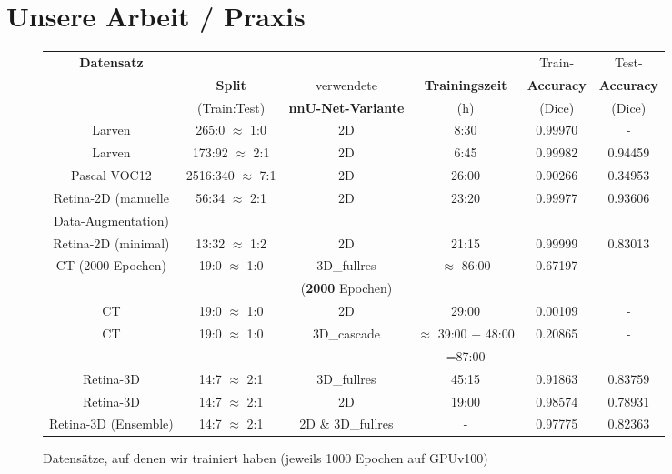 \section{Unsere Arbeit / Praxis}
\begin{figure}[H]
\begin{tabular}{|c|c|c|c|c|c|}
\hline 
\multirow{3}{*}{\textbf{Datensatz}} &  &  & & Train-& Test- \\ 
 & \textbf{Split} & verwendete & \textbf{Trainingszeit} & \textbf{Accuracy}& \textbf{Accuracy} \\ 
 & (Train:Test) & \textbf{nnU-Net-Variante} & (h) & (Dice)& (Dice)  \\ 
\hline 
\hline
Larven \cite{larven} & 265:0 $\approx$ 1:0 & 2D & 8:30 & 0.99970 & - \\ 
\hline 
Larven \cite{larven}& 173:92 $\approx$ 2:1 & 2D & 6:45 & 0.99982 & 0.94459 \\ 
\hline 
Pascal VOC12 \cite{PascalVOCDatensatz}& 2516:340 $\approx$ 7:1 & 2D & 26:00 & 0.90266 & 0.34953 \\ 
\hline 
Retina-2D \cite{retina2d} (manuelle & \multirow{2}{*}{56:34 $\approx$ 2:1} & \multirow{2}{*}{2D} & \multirow{2}{*}{23:20} & \multirow{2}{*}{0.99977} &\multirow{2}{*}{0.93606}  \\ 
Data-Augmentation)&  & & & &  \\ 
\hline 
Retina-2D \cite{retina2d} (minimal) & 13:32 $\approx$ 1:2 & 2D & 21:15 & 0.99999 &  0.83013 \\ 
\hline 
\multirow{2}{*}{CT \cite{ctDatensatz} (2000 Epochen)} & \multirow{2}{*}{19:0 $\approx$ 1:0} & 3D\_fullres & \multirow{2}{*}{$\approx$ 86:00}  & \multirow{2}{*}{0.67197} & \multirow{2}{*}{-} \\ 
 &  & (\textbf{2000} Epochen) & &  &  \\ 
\hline 
CT \cite{ctDatensatz} & 19:0 $\approx$ 1:0 & 2D & 29:00 & 0.00109 & - \\ 
\hline 
\multirow{2}{*}{CT \cite{ctDatensatz}} & \multirow{2}{*}{19:0 $\approx$ 1:0} & \multirow{2}{*}{3D\_cascade} & $\approx$ 39:00 + 48:00 & \multirow{2}{*}{0.20865} & \multirow{2}{*}{-} \\ 
 &  &  & =87:00 &  & \\ 
\hline 
Retina-3D \cite{retina3dDatensatz} & 14:7 $\approx$ 2:1 & 3D\_fullres & 45:15 & 0.91863 & 0.83759 \\ 
\hline 
Retina-3D \cite{retina3dDatensatz} & 14:7 $\approx$ 2:1  & 2D & 19:00 & 0.98574 & 0.78931 \\ 
\hline 
Retina-3D \cite{retina3dDatensatz} (Ensemble) & 14:7 $\approx$ 2:1 & 2D \& 3D\_fullres & - & 0.97775 & 0.82363 \\ 
\hline
\end{tabular} 
\caption{Datensätze, auf denen wir trainiert haben (jeweils 1000 Epochen auf GPUv100)\\[1.7cm]}
\label{tab:Training}
\end{figure}

